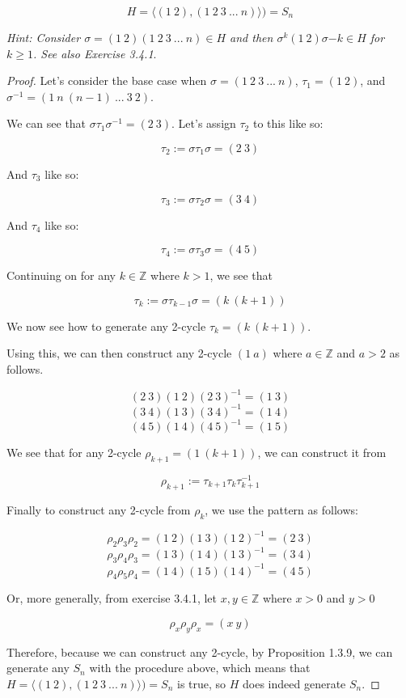 \documentclass[a4paper]{article}
\begin{document}
\begin{myparindent}{0pt}
\[ H = \langle (1 ~2), (1 ~2 ~3 ~... ~n) \rangle) = S_n \]

\textit{Hint: Consider $\sigma = (1 ~2)(1 ~2 ~3 ~... ~n) \in H$ and then
$\sigma^k (1 ~2) \sigma{-k} \in H$ for $k \geq 1$. See also Exercise 3.4.1}.

\begin{proof}
  Let's consider the base case when $\sigma = (1 ~2 ~3 ~... ~n)$, $\tau_1 = (1 ~2)$,
  and $\sigma^{-1} = (1 ~n ~(n - 1) ~... ~3 ~2)$.

  We can see that $\sigma \tau_1 \sigma^{-1} = (2 ~3)$. Let's assign $\tau_2$ to
  this like so:

  \[ \tau_2 :=  \sigma \tau_1 \sigma = (2 ~3) \]

  And $\tau_3$ like so:

  \[ \tau_3 :=  \sigma \tau_2 \sigma = (3 ~4) \]

  And $\tau_4$ like so:

  \[ \tau_4 :=  \sigma \tau_3 \sigma = (4 ~5) \]

  Continuing on for any $k \in \mathbb{Z}$ where $k > 1$, we see that

  \[ \tau_{k} :=  \sigma \tau_{k - 1} \sigma = (k ~(k + 1)) \]

  We now see how to generate any 2-cycle $\tau_k = (k ~(k + 1))$.
  \newline

  Using this, we can then construct any 2-cycle $(1 ~a)$ where $a \in \mathbb{Z}$
  and $a > 2$ as follows.

  \[ (2 ~3) (1 ~2) (2 ~3)^{-1} = (1 ~3) \]
  \[ (3 ~4) (1 ~3) (3 ~4)^{-1} = (1 ~4) \]
  \[ (4 ~5) (1 ~4) (4 ~5)^{-1} = (1 ~5) \]

  We see that for any 2-cycle $\rho_{k + 1} = (1 ~(k + 1))$, we can construct it from

  \[ \rho_{k + 1} := \tau_{k + 1} \tau_k \tau_{k + 1}^{-1} \]

  Finally to construct any 2-cycle from $\rho_k$, we use the pattern as follows:

  \[ \rho_2 \rho_3 \rho_2 = (1 ~2)(1 ~3)(1 ~2)^{-1} = (2 ~3) \]
  \[ \rho_3 \rho_4 \rho_3 = (1 ~3)(1 ~4)(1 ~3)^{-1} = (3 ~4) \]
  \[ \rho_4 \rho_5 \rho_4 = (1 ~4)(1 ~5)(1 ~4)^{-1} = (4 ~5) \]

  Or, more generally, from exercise 3.4.1, let $x, y \in \mathbb{Z}$ where $x > 0$ and $y > 0$

  \[ \rho_x \rho_y \rho_x = (x ~y) \]

  Therefore, because we can construct any 2-cycle, by Proposition 1.3.9, we can
  generate any $S_n$ with the procedure above, which means that
  $H = \langle (1 ~2), (1 ~2 ~3 ~... ~n) \rangle) = S_n$ is true, so $H$ does
  indeed generate $S_n$.
\end{proof}


\end{myparindent}
\end{document}
